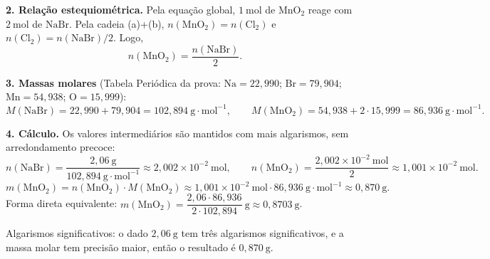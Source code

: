 \documentclass{article}%
\begin{document}
\textbf{2. Relação estequiométrica.} Pela equação global, $1\ \mathrm{mol}$ de $\mathrm{MnO_2}$ reage com $2\ \mathrm{mol}$ de $\mathrm{NaBr}$. Pela cadeia (a)+(b), $n(\mathrm{MnO_2}) = n(\mathrm{Cl_2})$ e $n(\mathrm{Cl_2}) = n(\mathrm{NaBr})/2$. Logo,
\[ n(\mathrm{MnO_2}) = \frac{n(\mathrm{NaBr})}{2}. \]

\textbf{3. Massas molares} (Tabela Periódica da prova: $\mathrm{Na} = 22{,}990$; $\mathrm{Br} = 79{,}904$; $\mathrm{Mn} = 54{,}938$; $\mathrm{O} = 15{,}999$):
\[ M(\mathrm{NaBr}) = 22{,}990 + 79{,}904 = 102{,}894\ \mathrm{g\cdot mol^{-1}}, \qquad M(\mathrm{MnO_2}) = 54{,}938 + 2\cdot 15{,}999 = 86{,}936\ \mathrm{g\cdot mol^{-1}}. \]

\textbf{4. Cálculo.} Os valores intermediários são mantidos com mais algarismos, sem arredondamento precoce:
\[ n(\mathrm{NaBr}) = \frac{2{,}06\ \mathrm{g}}{102{,}894\ \mathrm{g\cdot mol^{-1}}} \approx 2{,}002\times 10^{-2}\ \mathrm{mol}, \qquad n(\mathrm{MnO_2}) = \frac{2{,}002\times 10^{-2}\ \mathrm{mol}}{2} \approx 1{,}001\times 10^{-2}\ \mathrm{mol}. \]
\[ m(\mathrm{MnO_2}) = n(\mathrm{MnO_2})\cdot M(\mathrm{MnO_2}) \approx 1{,}001\times 10^{-2}\ \mathrm{mol}\cdot 86{,}936\ \mathrm{g\cdot mol^{-1}} \approx 0{,}870\ \mathrm{g}. \]
Forma direta equivalente: $m(\mathrm{MnO_2}) = \dfrac{2{,}06\cdot 86{,}936}{2\cdot 102{,}894}\ \mathrm{g} \approx 0{,}8703\ \mathrm{g}$.

Algarismos significativos: o dado $2{,}06\ \mathrm{g}$ tem três algarismos significativos, e a massa molar tem precisão maior, então o resultado é $0{,}870\ \mathrm{g}$.
\end{document}
